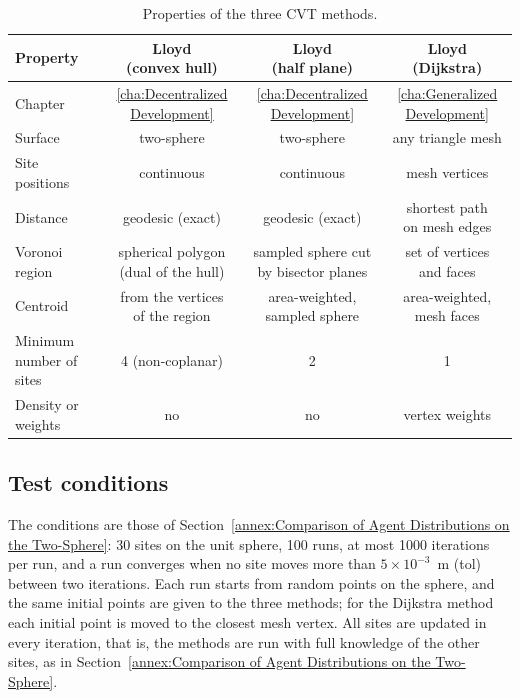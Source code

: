 \begin{table}[htbp]
\centering
\caption{Properties of the three \gls{CVT} methods.}
\label{tab.annex:cvt_properties}
\small\setlength{\tabcolsep}{4pt}
\begin{tabular}{lccc}
\toprule
Property & \makecell{Lloyd\\(convex hull)} & \makecell{Lloyd\\(half plane)} & \makecell{Lloyd\\(Dijkstra)} \\
\midrule
Chapter & \ref{cha:Decentralized Development} & \ref{cha:Decentralized Development} & \ref{cha:Generalized Development} \\
Surface & two-sphere & two-sphere & any triangle mesh \\
Site positions & continuous & continuous & mesh vertices \\
Distance & geodesic (exact) & geodesic (exact) & \makecell{shortest path\\on mesh edges} \\
Voronoi region & \makecell{spherical polygon\\(dual of the hull)} & \makecell{sampled sphere cut\\by bisector planes} & \makecell{set of vertices\\and faces} \\
Centroid & \makecell{from the vertices\\of the region} & \makecell{area-weighted,\\sampled sphere} & \makecell{area-weighted,\\mesh faces} \\
Minimum number of sites & 4 (non-coplanar) & 2 & 1 \\
Density or weights & no & no & vertex weights \\
\bottomrule
\end{tabular}
\end{table}

\subsection{Test conditions}

The conditions are those of Section~\ref{annex:Comparison of Agent Distributions on the Two-Sphere}: 30 sites on the unit sphere, 100 runs, at most 1000 iterations per run, and a run converges when no site moves more than $5\times10^{-3}$~m (tol) between two iterations. Each run starts from random points on the sphere, and the same initial points are given to the three methods; for the Dijkstra method each initial point is moved to the closest mesh vertex. All sites are updated in every iteration, that is, the methods are run with full knowledge of the other sites, as in Section~\ref{annex:Comparison of Agent Distributions on the Two-Sphere}.


